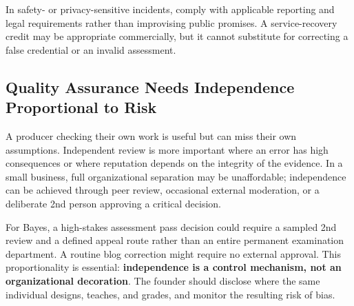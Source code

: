 In safety- or privacy-sensitive incidents, comply with applicable reporting and legal requirements rather than improvising public promises. A service-recovery credit may be appropriate commercially, but it cannot substitute for correcting a false credential or an invalid assessment.

\subsection{Quality Assurance Needs Independence Proportional to Risk}
\label{sec:independent_qa}

A producer checking their own work is useful but can miss their own assumptions. Independent review is more important where an error has high consequences or where reputation depends on the integrity of the evidence. In a small business, full organizational separation may be unaffordable; independence can be achieved through peer review, occasional external moderation, or a deliberate 2nd person approving a critical decision.

For Bayes, a high-stakes assessment pass decision could require a sampled 2nd review and a defined appeal route rather than an entire permanent examination department. A routine blog correction might require no external approval. This proportionality is essential: \textbf{independence is a control mechanism, not an organizational decoration}. The founder should disclose where the same individual designs, teaches, and grades, and monitor the resulting risk of bias.
